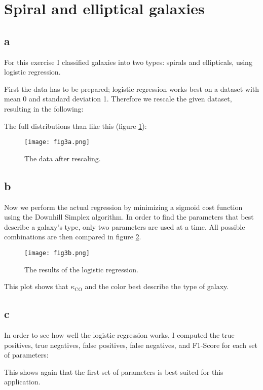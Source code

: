 \section{Spiral and elliptical galaxies}


\subsection*{a}
For this exercise I classified galaxies into two types: spirals and ellipticals, using logistic regression.

First the data has to be prepared; logistic regression works best on a dataset with mean 0 and standard deviation 1.
Therefore we rescale the given dataset, resulting in the following:


The full distributions than like this (figure \ref{fig:rescaled_data}):
\begin{figure}
    \centering
    \texttt{[image: fig3a.png]}
    \caption{The data after rescaling.}
    \label{fig:rescaled_data}
\end{figure}



\subsection*{b}
Now we perform the actual regression by minimizing a sigmoid cost function using the Downhill Simplex algorithm.
In order to find the parameters that best describe a galaxy's type, only two parameters are used at a time.
All possible combinations are then compared in figure \ref{fig:logistic_regression}.

\begin{figure}
    \centering
    \texttt{[image: fig3b.png]}
    \caption{The results of the logistic regression.}
    \label{fig:logistic_regression}
\end{figure}

This plot shows that $\kappa_{\text{CO}}$ and the color best describe the type of galaxy.



\subsection*{c}
In order to see how well the logistic regression works, I computed the true positives, true negatives, false positives, false negatives, and F1-Score for each set of parameters:


This shows again that the first set of parameters is best suited for this application.

